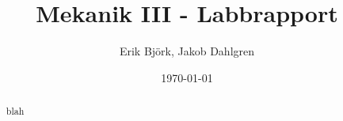 \documentclass[12pt,a4paper]{article}
\title{Mekanik III - Labbrapport}
\author{Erik Björk, Jakob Dahlgren}
\date{\today}
\numberwithin{equation}{section}
\numberwithin{figure}{section}
\begin{document}
\maketitle
\clearpage

\tableofcontents

\begin{abstract}
    blah
\end{abstract}








\appendix

\end{document}
